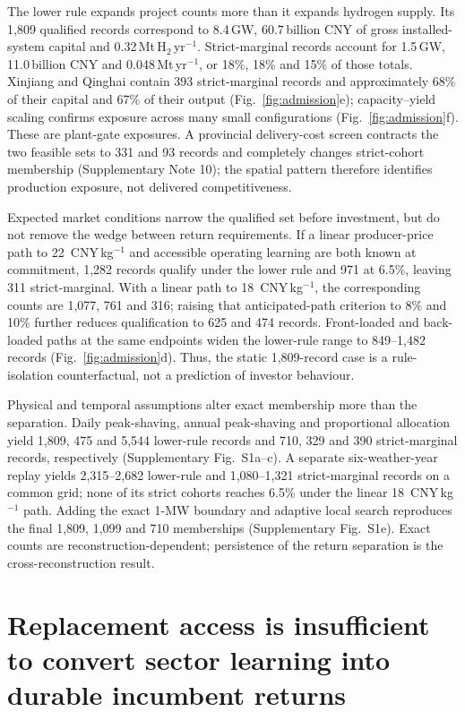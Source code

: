 \documentclass[11pt,a4paper]{article}
\newcommand{\cnykg}{CNY\,kg$^{-1}$}
\begin{document}
The lower rule expands project counts more than it expands hydrogen supply. Its 1,809 qualified records correspond to 8.4\,GW, 60.7\,billion CNY of gross installed-system capital and 0.32\,Mt\,H$_2$\,yr$^{-1}$. Strict-marginal records account for 1.5\,GW, 11.0\,billion CNY and 0.048\,Mt\,yr$^{-1}$, or 18\%, 18\% and 15\% of those totals. Xinjiang and Qinghai contain 393 strict-marginal records and approximately 68\% of their capital and 67\% of their output (Fig.~\ref{fig:admission}e); capacity--yield scaling confirms exposure across many small configurations (Fig.~\ref{fig:admission}f). These are plant-gate exposures. A provincial delivery-cost screen\cite{bi2026} contracts the two feasible sets to 331 and 93 records and completely changes strict-cohort membership (Supplementary Note 10); the spatial pattern therefore identifies production exposure, not delivered competitiveness.

Expected market conditions narrow the qualified set before investment, but do not remove the wedge between return requirements. If a linear producer-price path to 22~\cnykg{} and accessible operating learning are both known at commitment, 1,282 records qualify under the lower rule and 971 at 6.5\%, leaving 311 strict-marginal. With a linear path to 18~\cnykg{}, the corresponding counts are 1,077, 761 and 316; raising that anticipated-path criterion to 8\% and 10\% further reduces qualification to 625 and 474 records. Front-loaded and back-loaded paths at the same endpoints widen the lower-rule range to 849--1,482 records (Fig.~\ref{fig:admission}d). Thus, the static 1,809-record case is a rule-isolation counterfactual, not a prediction of investor behaviour.

Physical and temporal assumptions alter exact membership more than the separation. Daily peak-shaving, annual peak-shaving and proportional allocation yield 1,809, 475 and 5,544 lower-rule records and 710, 329 and 390 strict-marginal records, respectively (Supplementary Fig.~S1a--c). A separate six-weather-year replay yields 2,315--2,682 lower-rule and 1,080--1,321 strict-marginal records on a common grid; none of its strict cohorts reaches 6.5\% under the linear 18~\cnykg{} path. Adding the exact 1-MW boundary and adaptive local search reproduces the final 1,809, 1,099 and 710 memberships (Supplementary Fig.~S1e). Exact counts are reconstruction-dependent; persistence of the return separation is the cross-reconstruction result.

\section*{Replacement access is insufficient to convert sector learning into durable incumbent returns}
\end{document}
